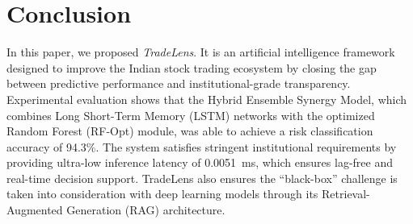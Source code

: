 \documentclass[twocolumn]{article}
\begin{document}
\section{Conclusion}

In this paper, we proposed \textit{TradeLens}. It is an artificial intelligence framework designed to improve the Indian stock trading ecosystem by closing the gap between predictive performance and institutional-grade transparency. Experimental evaluation shows that the Hybrid Ensemble Synergy Model, which combines Long Short-Term Memory (LSTM) networks with the optimized Random Forest (RF-Opt) module, was able to achieve a risk classification accuracy of 94.3\%. The system satisfies stringent institutional requirements by providing ultra-low inference latency of 0.0051~ms, which ensures lag-free and real-time decision support. TradeLens also ensures the ``black-box'' challenge is taken into consideration with deep learning models through its Retrieval-Augmented Generation (RAG) architecture.



\end{document}
